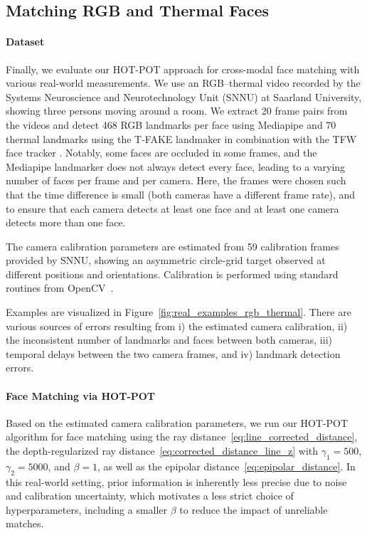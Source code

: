 \documentclass[10pt, twocolumn]{article}
\theoremstyle{definition}
\begin{document}
\subsection{Matching RGB and Thermal Faces} \label{sec:RGB_thermal}

\paragraph*{Dataset}
Finally, we evaluate our HOT-POT approach for cross-modal face matching with various real-world measurements.
We use an RGB–thermal video recorded by the Systems Neuroscience and Neurotechnology Unit (SNNU) at Saarland University, showing three persons moving around a room. 
We extract 20 frame pairs from the videos and detect 468 RGB landmarks per face using Mediapipe \cite{lugaresi2019mediapipe} and 70 thermal landmarks using the T-FAKE landmaker \cite{flotho2025t} in combination with the TFW face tracker \cite{TFW}.
Notably, some faces are occluded in some frames, and the Mediapipe landmarker does not always detect every face, leading to a varying number of faces per frame and per camera.
Here, the frames were chosen such that the time difference is small (both cameras have a different frame rate), and to ensure that each camera detects at least one face and at least one camera detects more than one face. 

The camera calibration parameters are estimated from 59 calibration frames provided by SNNU, showing an asymmetric circle-grid target observed at different positions and orientations. Calibration is performed using standard routines from OpenCV~\cite{opencv_library}.

Examples are visualized in Figure~\ref{fig:real_examples_rgb_thermal}.
There are various sources of errors resulting from
i) the estimated camera calibration, 
ii) the inconsistent number of landmarks and faces between both cameras,
iii) temporal delays between the two camera frames,
and
iv) landmark detection errors.

\paragraph*{Face Matching via HOT-POT}
Based on the estimated camera calibration parameters, we run our HOT-POT algorithm for face matching using the ray distance~\eqref{eq:line_corrected_distance}, the depth-regularized ray distance~\eqref{eq:corrected_distance_line_z} with $\gamma_1 = 500$, $\gamma_2 = 5000$, and $\beta = 1$, as well as the epipolar distance~\eqref{eq:epipolar_distance}. {\color{black} In this real-world setting, prior information is inherently less precise due to noise and calibration uncertainty, which motivates a less strict choice of hyperparameters, including a smaller $\beta$ to reduce the impact of unreliable matches.}
\end{document}
